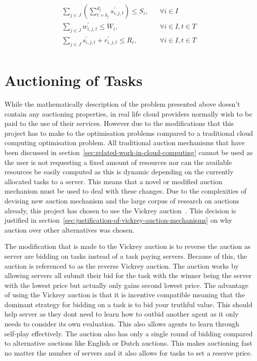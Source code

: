 \begin{align}
    \sum_{j \in J} \left(\sum^{d_j}_{t=b_j} s^{'}_{i,j,t} \right) \leq S_i, && \forall{i \in I} \label{eq:server_storage_capacity} \\
    \sum_{j \in J} w^{'}_{i,j,t} \leq W_i, && \forall{i \in I, t \in T} \label{eq:server_computation_capacity} \\
    \sum_{j \in J} s^{'}_{i,j,t} + r^{'}_{i,j,t} \leq R_i, && \forall{i \in I, t \in T} \label{eq:server_bandwidth_capacity} \\
\end{align}

\section{Auctioning of Tasks}\label{sec:auctioning-of-tasks}
While the mathematically description of the problem presented above doesn't contain any auctioning properties, in real
life cloud providers normally wish to be paid to the use of their services. However due to the modifications that
this project has to make to the optimisation problems compared to a traditional cloud computing optimisation problem.
All traditional auction mechanisms that have been discussed in section~\ref{sec:related-work-in-cloud-computing} cannot
be used as the user is not requesting a fixed amount of resources nor can the available resources be easily computed
as this is dynamic depending on the currently allocated tasks to a server. This means that a novel or modified auction
mechanism must be used to deal with these changes. Due to the complexities of devising new auction mechanism and the
large corpus of research on auctions already, this project has chosen to use the Vickrey auction~\citep{vickrey}.
This decision is justified in section~\ref{sec:justification-of-vickrey-auction-mechanisms} on why auction over other
alternatives was chosen.

The modification that is made to the Vickrey auction is to reverse the auction as server are bidding on tasks instead of
a task paying servers. Because of this, the auction is referenced to as the reverse Vickrey auction. The auction works
by allowing servers all submit their bid for the task with the winner being the server with the lowest
price but actually only gains second lowest price. The advantage of using the Vickrey auction is that it is  incentive
compatible meaning that the dominant strategy for bidding on a task is to bid your truthful value. This should help
server as they dont need to learn how to outbid another agent as it only needs to consider its own evaluation.
This also allows agents to learn through self-play effectively. The auction also has only a single round of bidding
compared to alternative auctions like English or Dutch auctions. This makes auctioning fast no matter the number of
servers and it also allows for tasks to set a reserve price.

